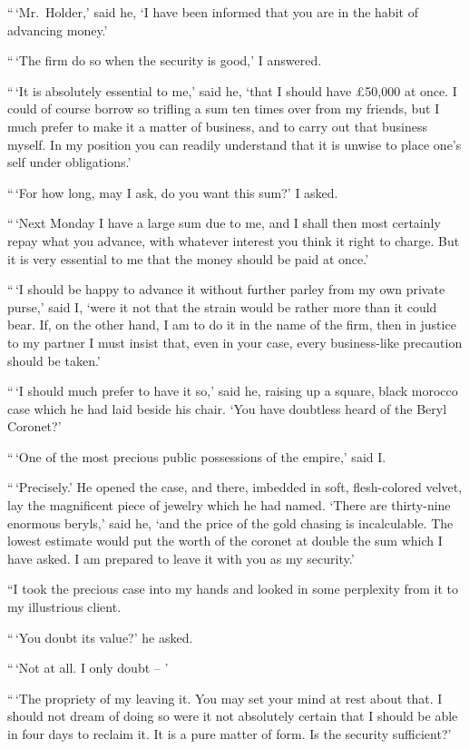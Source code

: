 “\,‘Mr.~Holder,’ said he, ‘I have been informed that you are
in the habit of advancing money.’

“\,‘The firm do so when the security is good,’ I answered.

“\,‘It is absolutely essential to me,’ said he, ‘that I should
have £50,000 at once. I could of course borrow so trifling a
sum ten times over from my friends, but I much prefer to make
it a matter of business, and to carry out that business myself.
In my position you can readily understand that it is unwise to
place one’s self under obligations.’

“\,‘For how long, may I ask, do you want this sum?’ I asked.

“\,‘Next Monday I have a large sum due to me, and I shall
then most certainly repay what you advance, with whatever
interest you think it right to charge. But it is very essential
to me that the money should be paid at once.’

“\,‘I should be happy to advance it without further parley
from my own private purse,’ said I, ‘were it not that the
strain would be rather more than it could bear. If, on the
other hand, I am to do it in the name of the firm, then in
justice to my partner I must insist that, even in your case,
every business-like precaution should be taken.’

“\,‘I should much prefer to have it so,’ said he, raising up a
square, black morocco case which he had laid beside his chair.
‘You have doubtless heard of the Beryl Coronet?’

“\,‘One of the most precious public possessions of the empire,’
said I.

“\,‘Precisely.’ He opened the case, and there, imbedded
in soft, flesh-colored velvet, lay the magnificent piece of
jewelry which he had named. ‘There are thirty-nine enormous
beryls,’ said he, ‘and the price of the gold chasing is
incalculable. The lowest estimate would put the worth of the
coronet at double the sum which I have asked. I am prepared
to leave it with you as my security.’

“I took the precious case into my hands and looked in
some perplexity from it to my illustrious client.

“\,‘You doubt its value?’ he asked.

“\,‘Not at all. I only doubt -- ’

“\,‘The propriety of my leaving it. You may set your mind
at rest about that. I should not dream of doing so were
it not absolutely certain that I should be able in four days
to reclaim it. It is a pure matter of form. Is the security
sufficient?’

